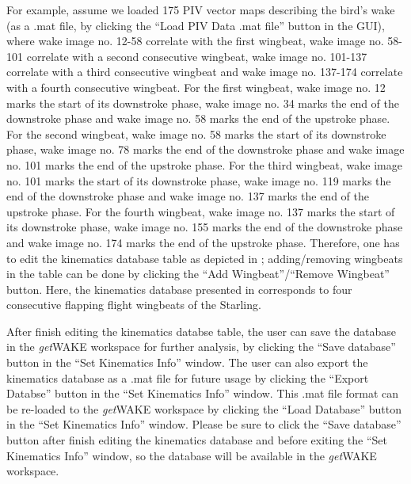 \documentclass[12pt,a4paper]{article}
\begin{document}
For example, assume we loaded 175 PIV vector maps describing the bird's wake (as a .mat file, by clicking the ``Load PIV Data .mat file'' button in the GUI), where wake image no. 12-58 correlate with the first wingbeat, wake image no. 58-101 correlate with a second consecutive wingbeat, wake image no. 101-137 correlate with a third consecutive wingbeat and wake image no. 137-174 correlate with a fourth consecutive wingbeat. For the first wingbeat, wake image no. 12 marks the start of its downstroke phase, wake image no. 34 marks the end of the downstroke phase and wake image no. 58 marks the end of the upstroke phase. For the second wingbeat, wake image no. 58 marks the start of its downstroke phase, wake image no. 78 marks the end of the downstroke phase and wake image no. 101 marks the end of the upstroke phase. For the third wingbeat, wake image no. 101 marks the start of its downstroke phase, wake image no. 119 marks the end of the downstroke phase and wake image no. 137 marks the end of the upstroke phase. For the fourth wingbeat, wake image no. 137 marks the start of its downstroke phase, wake image no. 155 marks the end of the downstroke phase and wake image no. 174 marks the end of the upstroke phase.
Therefore, one has to edit the kinematics database table as depicted in ; adding/removing wingbeats in the table can be done by clicking the ``Add Wingbeat''/``Remove Wingbeat'' button. 
Here, the kinematics database presented in  corresponds to four consecutive flapping flight wingbeats of the Starling. 

After finish editing the kinematics databse table, the user can save the database in the \textit{get}WAKE workspace for further analysis, by clicking the ``Save database'' button in the ``Set Kinematics Info'' window. 
The user can also export the kinematics database as a .mat file for future usage by clicking the ``Export Databse'' button in the ``Set Kinematics Info'' window. 
This .mat file format can be re-loaded to the \textit{get}WAKE workspace by clicking the ``Load Database'' button in the ``Set Kinematics Info'' window.
Please be sure to click the ``Save database'' button after finish editing the kinematics database and before exiting the ``Set Kinematics Info'' window, so the database will be available in the \textit{get}WAKE workspace.
\end{document}
